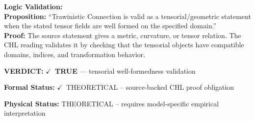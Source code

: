 \textbf{Logic Validation:}\\
\textbf{Proposition:} ``Trawinistic Connection is valid as a tensorial/geometric statement when the stated
tensor fields are well formed on the specified domain.''\\
\textbf{Proof:} The source statement gives a metric, curvature, or tensor relation. The CHL reading
validates it by checking that the tensorial objects have compatible domains, indices,
and transformation behavior.

\textbf{VERDICT:} \ensuremath{\checkmark}\ \textbf{TRUE} --- tensorial well-formedness validation

\textbf{Formal Status:} \ensuremath{\checkmark}\ THEORETICAL -- source-backed CHL proof obligation

\textbf{Physical Status:} THEORETICAL -- requires model-specific empirical interpretation
\par\vspace{0.45em}
\par
\ifTZPDarkEdition
{}
\fi
\endgroup
\endgroup

